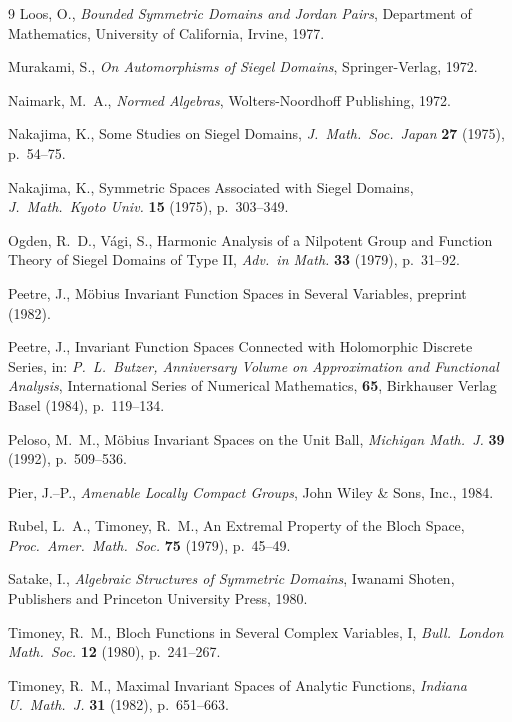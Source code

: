 \documentclass[10.5pt,reqno]{amsart}
\begin{document}
\begin{thebibliography}{9}
	Loos, O., \emph{Bounded Symmetric Domains and Jordan Pairs}, Department of Mathematics, University of California, Irvine, 1977.
	
	Murakami, S., \emph{On Automorphisms of Siegel Domains}, Springer-Verlag, 1972.
	
	Naimark, M.\ A., \emph{Normed Algebras}, Wolters-Noordhoff Publishing, 1972.
	
	Nakajima, K., Some Studies on Siegel Domains, \emph{J.\ Math.\ Soc.\ Japan} \textbf{27} (1975), p.~54--75.
	
	Nakajima, K., Symmetric Spaces Associated with Siegel Domains, \emph{J.\ Math.\ Kyoto Univ.} \textbf{15} (1975), p.~303--349.
	
	Ogden, R.\ D., V\'agi, S., Harmonic Analysis of a Nilpotent Group and Function Theory of Siegel Domains of Type II, \emph{Adv.\ in Math.} \textbf{33} (1979), p.~31--92.
	
	Peetre, J., M\"obius Invariant Function Spaces in Several Variables, preprint (1982).
	
	Peetre, J., Invariant Function Spaces Connected with Holomorphic Discrete Series, in: \emph{P.\ L.\ Butzer, Anniversary Volume on Approximation and Functional Analysis}, International Series of Numerical Mathematics, \textbf{65}, Birkhauser Verlag Basel (1984), p.~119--134.
	
	Peloso, M.\ M., M\"obius Invariant Spaces on the Unit Ball, \emph{Michigan Math.\ J.} \textbf{39} (1992), p.~509--536.
	
	Pier, J.--P., \emph{Amenable Locally Compact Groups}, John Wiley \& Sons, Inc., 1984.
	
	Rubel, L.\ A., Timoney, R.\ M., An Extremal Property of the Bloch Space, \emph{Proc.\ Amer.\ Math.\ Soc.} \textbf{75} (1979), p.~45--49.
	
	Satake, I., \emph{Algebraic Structures of Symmetric Domains}, Iwanami Shoten, Publishers and Princeton University Press, 1980.
	
	
	Timoney, R.\ M., Bloch Functions in Several Complex Variables, I, \emph{Bull.\ London Math.\ Soc.} \textbf{12} (1980), p.~241--267.
	
	Timoney, R.\ M., Maximal Invariant Spaces of Analytic Functions, \emph{Indiana U.\ Math.\ J.} \textbf{31} (1982), p.~651--663.
	

\end{thebibliography}
\end{document}
